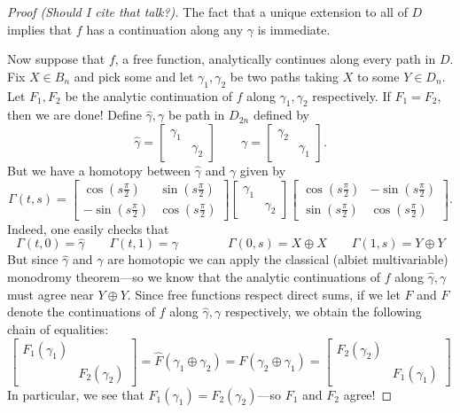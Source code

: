 \begin{proof}
  [Proof (Should I cite that talk?)]
  The fact that a unique extension to all of \(D\) implies that \(f\) has a
  continuation along any \(\gamma\) is immediate.

  Now suppose that \(f\), a free function, analytically continues along every
  path in \(D\). Fix \(X \in B_n\) and pick some and let \(\gamma_1,\gamma_2\)
  be two paths taking \(X\) to some \(Y \in D_n\). Let \(F_1,F_2\) be the
  analytic continuation of \(f\) along \(\gamma_1,\gamma_2\) respectively. If
  \(F_1=F_2\), then we are done! Define \(\hat{\gamma}, \gamma\) be path in
  \(D_{2n}\) defined by
  \[
    \hat{\gamma} = \begin{bmatrix} \gamma_1&\\&\gamma_2 \end{bmatrix} \qquad
    \gamma = \begin{bmatrix} \gamma_2&\\&\gamma_1 \end{bmatrix}.
  \]
  But we have a homotopy between \(\hat{\gamma}\) and \(\gamma\) given by
  \[
    \Gamma(t,s) =
    \begin{bmatrix} \cos (s\frac{\pi}{2}) & \sin (s\frac{\pi}{2})\\-\sin (s\frac{\pi}{2}) & \cos (s\frac{\pi}{2}) \end{bmatrix}
    \begin{bmatrix} \gamma_1&\\&\gamma_2 \end{bmatrix}
    \begin{bmatrix} \cos (s\frac{\pi}{2}) & -\sin (s\frac{\pi}{2})\\\sin (s\frac{\pi}{2}) & \cos (s\frac{\pi}{2}) \end{bmatrix}.
  \]
  Indeed, one easily checks that
  \[
    \Gamma(t,0) = \hat{\gamma}\qquad
    \Gamma(t,1) = \gamma \qquad \qquad
    \Gamma(0,s) = X\oplus X\qquad
    \Gamma(1,s) = Y \oplus Y
  \]
  But since \(\hat{\gamma}\) and \(\gamma\) are homotopic we can apply the
  classical (albiet multivariable) monodromy theorem---so we know that the
  analytic continuations of \(f\) along \(\hat{\gamma},\gamma\) must agree near
  \(Y \oplus Y\). Since free functions respect direct sums, if we let
  \(\hat{F}\) and \(F\) denote the continuations of \(f\) along
  \(\hat{\gamma},\gamma\) respectively, we obtain the
  following chain of equalities:
  \[
    \begin{bmatrix} F_1(\gamma_1) &\\&F_2(\gamma_2) \end{bmatrix}  =
    \hat{F}(\gamma_1 \oplus \gamma_2) = F (\gamma_2 \oplus \gamma_1) =
    \begin{bmatrix} F_2(\gamma_2)& \\ & F_1(\gamma_1) \end{bmatrix}
  \]
  In particular, we see that \(F_1(\gamma_1)=F_2(\gamma_2)\)---so \(F_1\) and
  \(F_2\) agree!
\end{proof}

